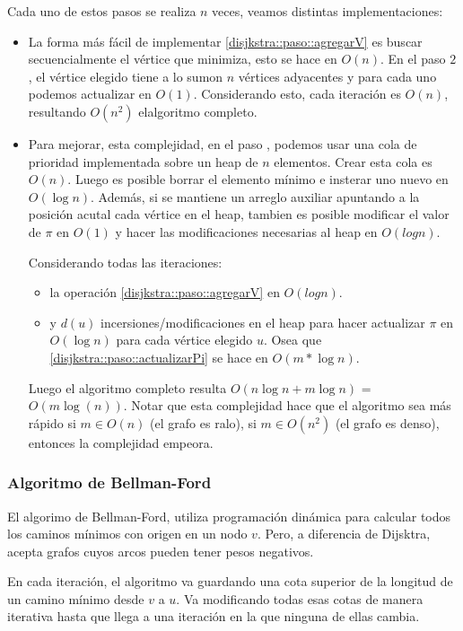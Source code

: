 Cada uno de estos pasos se realiza \(n\) veces, veamos distintas implementaciones:

\begin{itemize}
  \item La forma más fácil de implementar \ref{disjkstra::paso::agregarV} es buscar secuencialmente el vértice que minimiza, esto se hace en \(O(n)\). En el paso \(2\), el vértice elegido tiene a lo sumon \(n\) vértices adyacentes y para cada uno podemos actualizar en \(O(1)\). Considerando esto, cada iteración es \(O(n)\), resultando \(O(n^2)\) elalgoritmo completo.
  \item Para mejorar, esta complejidad, en el paso \label{dijsktra::paso::agregarV}, podemos usar una cola de prioridad implementada sobre un heap de \(n\) elementos. Crear esta cola es \(O(n)\). Luego es posible borrar el elemento mínimo e insterar uno nuevo en \(O(\log{n})\). Además, si se mantiene un arreglo auxiliar apuntando a la posición acutal cada vértice en el heap, tambien es posible modificar el valor de \(\pi\) en \(O(1)\) y hacer las modificaciones necesarias al heap en \(O(log n)\).

        Considerando todas las iteraciones:
        \begin{itemize}
          \item la operación \ref{disjkstra::paso::agregarV} en \(O(log n)\).
          \item y \(d(u)\) incersiones/modificaciones en el heap para hacer actualizar \(\pi\) en \(O(\log{n})\) para cada vértice elegido \(u\). Osea que \ref{disjkstra::paso::actualizarPi} se hace en \(O(m*\log{n})\).
        \end{itemize}

        Luego el algoritmo completo resulta \(O(n\log{n} + m\log{n})\) = \(O(m\log(n))\). Notar que esta complejidad hace que el algoritmo sea más rápido si \(m\in O(n)\) (el grafo es ralo), si \(m\in O(n^2)\) (el grafo es denso), entonces la complejidad empeora.
\end{itemize}

\subsubsection{Algoritmo de Bellman-Ford}
El algorimo de Bellman-Ford, utiliza programación dinámica para calcular todos los caminos mínimos con origen en un nodo \(v\). Pero, a diferencia de Dijsktra, acepta grafos cuyos arcos pueden tener pesos negativos.

En cada iteración, el algoritmo va guardando una cota superior de la longitud de un camino mínimo desde \(v\) a \(u\). Va modificando todas esas cotas de manera iterativa hasta que llega a una iteración en la que ninguna de ellas cambia.

